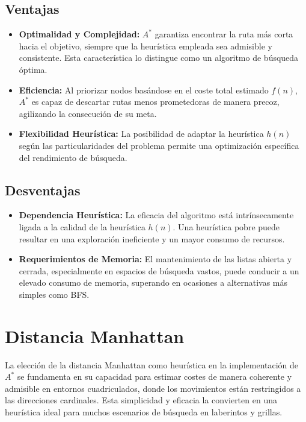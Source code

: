 \subsection{Ventajas}
\begin{itemize}
    \item \textbf{Optimalidad y Complejidad:} $A^{*}$ garantiza encontrar la ruta más corta hacia el objetivo, siempre que la heurística empleada sea admisible y consistente. Esta característica lo distingue como un algoritmo de búsqueda óptima.
    \item \textbf{Eficiencia:} Al priorizar nodos basándose en el coste total estimado \(f(n)\), $A^{*}$ es capaz de descartar rutas menos prometedoras de manera precoz, agilizando la consecución de su meta.
    \item \textbf{Flexibilidad Heurística:} La posibilidad de adaptar la heurística \(h(n)\) según las particularidades del problema permite una optimización específica del rendimiento de búsqueda.
\end{itemize}
\subsection{Desventajas}
\begin{itemize}
    \item \textbf{Dependencia Heurística:} La eficacia del algoritmo está intrínsecamente ligada a la calidad de la heurística \(h(n)\). Una heurística pobre puede resultar en una exploración ineficiente y un mayor consumo de recursos.
    \item \textbf{Requerimientos de Memoria:} El mantenimiento de las listas abierta y cerrada, especialmente en espacios de búsqueda vastos, puede conducir a un elevado consumo de memoria, superando en ocasiones a alternativas más simples como BFS.
\end{itemize}
\section{Distancia Manhattan}
La elección de la distancia Manhattan como heurística en la implementación de $A^{*}$ se fundamenta en su capacidad para estimar costes de manera coherente y admisible en entornos cuadriculados, donde los movimientos están restringidos a las direcciones cardinales. Esta simplicidad y eficacia la convierten en una heurística ideal para muchos escenarios de búsqueda en laberintos y grillas.
